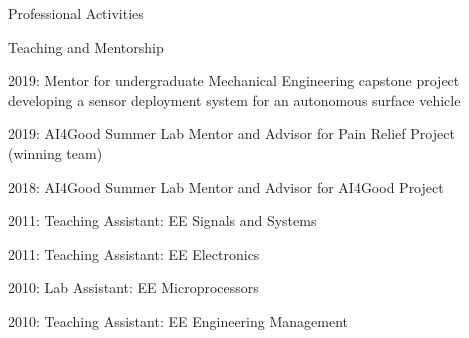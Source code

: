 \documentclass{resume} %
\begin{document}
\begin{rSection}{Professional Activities}
\begin{rSubsection}{Teaching and Mentorship}{}{}{}
\item{2019: Mentor for undergraduate Mechanical Engineering capstone project developing a sensor deployment system for an autonomous surface vehicle}
\item{2019: AI4Good Summer Lab Mentor and Advisor for Pain Relief Project (winning team)}
\item{2018: AI4Good Summer Lab Mentor and Advisor for AI4Good Project}
\item{2011: Teaching Assistant: EE Signals and Systems}
\item{2011: Teaching Assistant: EE Electronics}
\item{2010: Lab Assistant: EE Microprocessors}
\item{2010: Teaching Assistant: EE Engineering Management}
\end{rSubsection}
\vspace{-.2cm}
\end{rSection}
\end{document}
